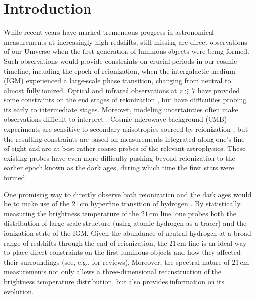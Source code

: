\documentclass[twocolumn,apj,numberedappendix]{emulateapj}
\begin{document}

\section{Introduction}

While recent years have marked tremendous progress in astronomical measurements at increasingly high redshifts, still missing are direct observations of our Universe when the first generation of luminous objects were being formed. Such observations would provide constraints on crucial periods in our cosmic timeline, including the epoch of reionization, when the intergalactic medium (IGM) experienced a large-scale phase transition, changing from neutral to almost fully ionized. Optical and infrared observations at $z \lesssim 7$ have provided some constraints on the end stages of reionization \citep{fan_et_al2006,bolton_et_al2011,treu_et_al2013,Faisst_et_al2014}, but have difficulties probing its early to intermediate stages. Moreover, modeling uncertainties often make observations difficult to interpret \citep{Dijkstra2014,Lidz2014}. Cosmic microwave background (CMB) experiments are sensitive to secondary anisotropies sourced by reionization \citep{WMAP9,zahn_et_al2012,George2014}, but the resulting constraints are based on measurements integrated along one's line-of-sight and are at best rather coarse probes of the relevant astrophysics. These existing probes have even more difficulty pushing beyond reionization to the earlier epoch known as the dark ages, during which time the first stars were formed.

One promising way to directly observe both reionization and the dark ages would be to make use of the $21\,\textrm{cm}$ hyperfine transition of hydrogen \citep{Madau_etal_1997}. By statistically measuring the brightness temperature of the $21\,\textrm{cm}$ line, one probes both the distribution of large scale structure (using atomic hydrogen as a tracer) and the ionization state of the IGM. Given the abundance of neutral hydrogen at a broad range of redshifts through the end of reionization, the $21\,\textrm{cm}$ line is an ideal way to place direct constraints on the first luminous objects and how they affected their surroundings (see, e.g., \citealt{Furlanetto2006,Morales2010,Pritchard2012,AviBook} for reviews). Moreover, the spectral nature of $21\,\textrm{cm}$ measurements not only allows a three-dimensional reconstruction of the brightness temperature distribution, but also provides information on its evolution.
\end{document}
